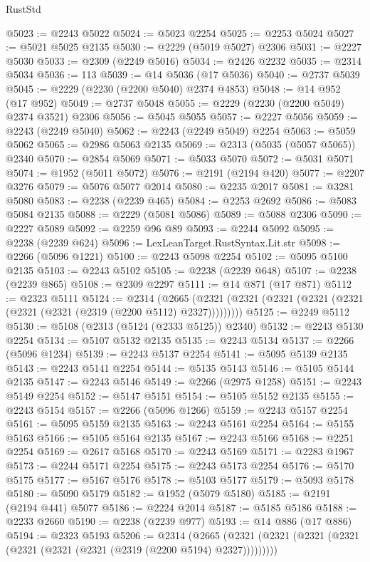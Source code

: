\begin{lexlean}{RustStd}
\begin{coremodule}
{\begin{coremodule}
{{{{{{{{{{{{{{{{{{{{{{{{{{{{{{{{{{@5023 := @2243 @5022
@5024 := @5023 @2254
@5025 := @2253 @5024
@5027 := @5021 @5025 @2135
@5030 := @2229 (@5019 @5027) @2306
@5031 := @2227 @5030
@5033 := @2309 (@2249 @5016)
@5034 := @2426 @2232
@5035 := @2314 @5034
@5036 := 113
@5039 := @14 @5036 (@17 @5036)
@5040 := @2737 @5039
@5045 := @2229 (@2230 (@2200 @5040) @2374 @4853)
@5048 := @14 @952 (@17 @952)
@5049 := @2737 @5048
@5055 := @2229 (@2230 (@2200 @5049) @2374 @3521) @2306
@5056 := @5045 @5055
@5057 := @2227 @5056
@5059 := @2243 (@2249 @5040)
@5062 := @2243 (@2249 @5049) @2254
@5063 := @5059 @5062
@5065 := @2986 @5063 @2135
@5069 := @2313 (@5035 (@5057 @5065)) @2340
@5070 := @2854 @5069
@5071 := @5033 @5070
@5072 := @5031 @5071
@5074 := @1952 (@5011 @5072)
@5076 := @2191 (@2194 @420)
@5077 := @2207 @3276
@5079 := @5076 @5077 @2014
@5080 := @2235 @2017
@5081 := @3281 @5080
@5083 := @2238 (@2239 @465)
@5084 := @2253 @2692
@5086 := @5083 @5084 @2135
@5088 := @2229 (@5081 @5086)
@5089 := @5088 @2306
@5090 := @2227 @5089
@5092 := @2259 @96 @89
@5093 := @2244 @5092
@5095 := @2238 (@2239 @624)
@5096 := LexLeanTarget.RustSyntax.Lit.str
@5098 := @2266 (@5096 @1221)
@5100 := @2243 @5098 @2254
@5102 := @5095 @5100 @2135
@5103 := @2243 @5102
@5105 := @2238 (@2239 @648)
@5107 := @2238 (@2239 @865)
@5108 := @2309 @2297
@5111 := @14 @871 (@17 @871)
@5112 := @2323 @5111
@5124 := @2314
    (@2665 (@2321 (@2321 (@2321 (@2321 (@2321 (@2321 (@2321 (@2319 (@2200 @5112) @2327)))))))))
@5125 := @2249 @5112
@5130 := @5108 (@2313 (@5124 (@2333 @5125)) @2340)
@5132 := @2243 @5130 @2254
@5134 := @5107 @5132 @2135
@5135 := @2243 @5134
@5137 := @2266 (@5096 @1234)
@5139 := @2243 @5137 @2254
@5141 := @5095 @5139 @2135
@5143 := @2243 @5141 @2254
@5144 := @5135 @5143
@5146 := @5105 @5144 @2135
@5147 := @2243 @5146
@5149 := @2266 (@2975 @1258)
@5151 := @2243 @5149 @2254
@5152 := @5147 @5151
@5154 := @5105 @5152 @2135
@5155 := @2243 @5154
@5157 := @2266 (@5096 @1266)
@5159 := @2243 @5157 @2254
@5161 := @5095 @5159 @2135
@5163 := @2243 @5161 @2254
@5164 := @5155 @5163
@5166 := @5105 @5164 @2135
@5167 := @2243 @5166
@5168 := @2251 @2254
@5169 := @2617 @5168
@5170 := @2243 @5169
@5171 := @2283 @1967
@5173 := @2244 @5171 @2254
@5175 := @2243 @5173 @2254
@5176 := @5170 @5175
@5177 := @5167 @5176
@5178 := @5103 @5177
@5179 := @5093 @5178
@5180 := @5090 @5179
@5182 := @1952 (@5079 @5180)
@5185 := @2191 (@2194 @441) @5077
@5186 := @2224 @2014
@5187 := @5185 @5186
@5188 := @2233 @2660
@5190 := @2238 (@2239 @977)
@5193 := @14 @886 (@17 @886)
@5194 := @2323 @5193
@5206 := @2314
    (@2665 (@2321 (@2321 (@2321 (@2321 (@2321 (@2321 (@2321 (@2319 (@2200 @5194) @2327)))))))))
}}}}}}}}}}}}}}}}}}}}}}}}}}}}}}}}}}
\end{coremodule}}
\end{coremodule}
\end{lexlean}
